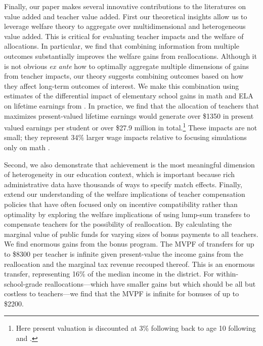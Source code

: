 \documentclass[12pt]{article}
\theoremstyle{definition}
\theoremstyle{definition}
\theoremstyle{definition}
\theoremstyle{definition}
\begin{document}
Finally, our paper makes several innovative contributions to the literatures on value added and teacher value added. First our theoretical insights allow us to leverage welfare theory to aggregate over multidimensional and heterogeneous value added. This is critical for evaluating teacher impacts and the welfare of allocations. In particular, we find that combining information from multiple outcomes substantially improves the welfare gains from reallocations. Although it is not obvious \textit{ex ante} how to optimally aggregate multiple dimensions of gains from teacher impacts, our theory suggests combining outcomes based on how they affect long-term outcomes of interest. We make this combination using estimates of the differential impact of elementary school gains in math and ELA on lifetime earnings from \citet{chetty2014measuring2}. In practice, we find that the allocation of teachers that maximizes present-valued lifetime earnings would generate over \$1350 in present valued earnings per student or over \$27.9 million in total.\footnote{Here present valuation is discounted at 3\% following back to age 10 following \citet{krueger1999experimental} and \citet{chetty2014measuring2}.} These impacts are not small; they represent 34\% larger wage impacts relative to focusing simulations only on math \citep[as in][]{chetty2014measuring1,Delgado2020,bates2022teacher}. 

Second, we also demonstrate that achievement is the most meaningful dimension of heterogeneity in our education context, which is important because rich administrative data have thousands of ways to specify match effects. Finally, extend our understanding of the welfare implications of teacher compensation policies that have often focused only on incentive compatibility rather than optimality \citep[e.g.,][]{rothstein2015teacher,bates2022teacher} by exploring the welfare implications of using lump-sum transfers to compensate teachers for the possibility of reallocation. By calculating the marginal value of public funds \citep[MVPF][]{Keyser_2020} for varying sizes of bonus payments to all teachers. We find enormous gains from the bonus program. The MVPF of transfers for up to \$8300 per teacher is infinite given present-value the income gains from the reallocation and the marginal tax revenue recouped thereof. This is an enormous transfer, representing 16\% of the median income in the district. For within-school-grade reallocations---which have smaller gains but which should be all but costless to teachers---we find that the MVPF is infinite for bonuses of up to \$2200. 
\end{document}
